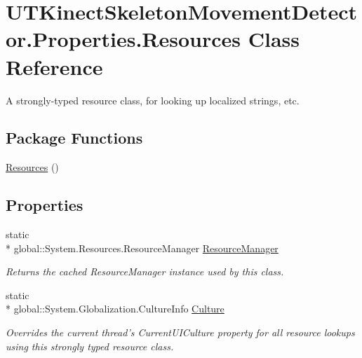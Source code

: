 \hypertarget{classUTKinectSkeletonMovementDetector_1_1Properties_1_1Resources}{\section{U\-T\-Kinect\-Skeleton\-Movement\-Detector.\-Properties.\-Resources Class Reference}
\label{classUTKinectSkeletonMovementDetector_1_1Properties_1_1Resources}
}


A strongly-\/typed resource class, for looking up localized strings, etc.  


\subsection*{Package Functions}
\begin{DoxyCompactItemize}
\item 
\hyperlink{classUTKinectSkeletonMovementDetector_1_1Properties_1_1Resources_aa2b2cecd0d28bdfcf314a13c435ee1a1}{Resources} ()
\end{DoxyCompactItemize}
\subsection*{Properties}
\begin{DoxyCompactItemize}
\item 
static \\*
global\-::\-System.\-Resources.\-Resource\-Manager \hyperlink{classUTKinectSkeletonMovementDetector_1_1Properties_1_1Resources_a3eef1a8dae6b38b004ce7f5d6b155ace}{Resource\-Manager}
\begin{DoxyCompactList}\small\item\em Returns the cached Resource\-Manager instance used by this class. \end{DoxyCompactList}\item 
static \\*
global\-::\-System.\-Globalization.\-Culture\-Info \hyperlink{classUTKinectSkeletonMovementDetector_1_1Properties_1_1Resources_a608c03f2809c649fadf649684bd8abb9}{Culture}
\begin{DoxyCompactList}\small\item\em Overrides the current thread's Current\-U\-I\-Culture property for all resource lookups using this strongly typed resource class. \end{DoxyCompactList}\end{DoxyCompactItemize}
